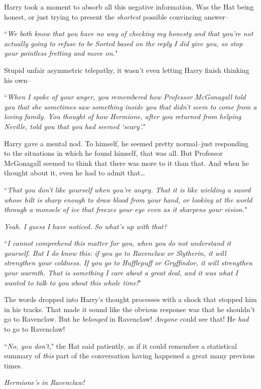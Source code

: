 Harry took a moment to absorb all this negative information. Was the Hat being honest, or just trying to present the \emph{shortest} possible convincing answer\---

``\emph{We both know that you have no way of checking my honesty and that you're not actually going to refuse to be Sorted based on the reply I did give you, so stop your pointless fretting and move on.}"

Stupid unfair asymmetric telepathy, it wasn't even letting Harry finish thinking his own\---

``\emph{When I spoke of your anger, you remembered how Professor McGonagall told you that she sometimes saw something inside you that didn't seem to come from a loving family. You thought of how Hermione, after you returned from helping Neville, told you that you had seemed `scary'.}"

Harry gave a mental nod. To himself, he seemed pretty normal\---just responding to the situations in which he found himself, that was all. But Professor McGonagall seemed to think that there was more to it than that. And when he thought about it, even he had to admit that{\ldots}

``\emph{That you don't like yourself when you're angry. That it is like wielding a sword whose hilt is sharp enough to draw blood from your hand, or looking at the world through a monocle of ice that freezes your eye even as it sharpens your vision.}"

\emph{Yeah. I guess I have noticed. So what's up with that?}

``\emph{I cannot comprehend this matter for you, when you do not understand it yourself. But I do know this: if you go to Ravenclaw or Slytherin, it will strengthen your coldness. If you go to Hufflepuff or Gryffindor, it will strengthen your warmth. \emph{That} is something I care about a great deal, and it was what I wanted to talk to you about this whole time!}"

The words dropped into Harry's thought processes with a shock that stopped him in his tracks. That made it sound like the obvious response was that he shouldn't go to Ravenclaw. But he \emph{belonged} in Ravenclaw! \emph{Anyone} could see that! He \emph{had} to go to Ravenclaw!

``\emph{No, you don't,}" the Hat said patiently, as if it could remember a statistical summary of \emph{this} part of the conversation having happened a great many previous times.

\emph{Hermione's in Ravenclaw!}

